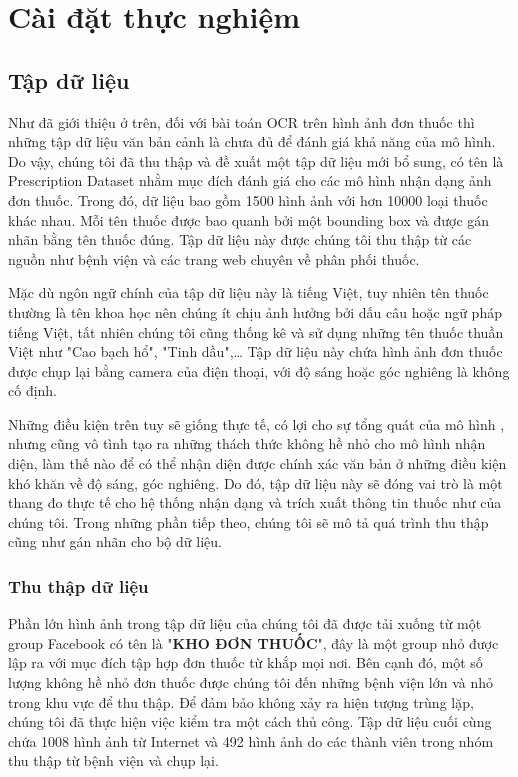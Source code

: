 \chapter{Cài đặt thực nghiệm}
\label{Chapter4}

\section{Tập dữ liệu}

Như đã giới thiệu ở trên, đối với bài toán OCR trên hình ảnh đơn thuốc thì những tập dữ liệu văn bản cảnh là chưa đủ để đánh giá khả năng của mô hình. Do vậy, chúng tôi đã thu thập và đề xuất một tập dữ liệu mới bổ sung, có tên là Prescription Dataset nhằm mục đích đánh giá cho các mô hình nhận dạng ảnh đơn thuốc. Trong đó, dữ liệu bao gồm 1500 hình ảnh với hơn 10000 loại thuốc khác nhau. Mỗi tên thuốc được bao quanh bởi một bounding box và được gán nhãn bằng tên thuốc đúng. Tập dữ liệu này được chúng tôi thu thập từ các nguồn như bệnh viện và các trang web chuyên về phân phối thuốc.

Mặc dù ngôn ngữ chính của tập dữ liệu này là tiếng Việt, tuy nhiên tên thuốc thường là tên khoa học nên chúng ít chịu ảnh hưởng bởi dấu câu hoặc ngữ pháp tiếng Việt, tất nhiên chúng tôi cũng thống kê và sử dụng những tên thuốc thuần Việt như "Cao bạch hổ", "Tinh dầu",… Tập dữ liệu này chứa hình ảnh đơn thuốc được chụp lại bằng camera của điện thoại, với độ sáng hoặc góc nghiêng là không cố định.

Những điều kiện trên tuy sẽ giống thực tế, có lợi cho sự tổng quát của mô hình , nhưng cũng vô tình tạo ra những thách thức không hề nhỏ cho mô hình nhận diện, làm thế nào để có thể nhận diện được chính xác văn bản ở những điều kiện khó khăn về độ sáng, góc nghiêng. Do đó, tập dữ liệu này sẽ đóng vai trò là một thang đo thực tế cho hệ thống nhận dạng và trích xuất thông tin thuốc như của chúng tôi. Trong những phần tiếp theo, chúng tôi sẽ mô tả quá trình thu thập cũng như gán nhãn cho bộ dữ liệu.

\subsection{Thu thập dữ liệu}
Phần lớn hình ảnh trong tập dữ liệu của chúng tôi đã được tải xuống từ một group
Facebook có tên là "\textbf{KHO ĐƠN THUỐC}", đây là một group nhỏ được lập ra với mục đích tập
hợp đơn thuốc từ khắp mọi nơi. Bên cạnh đó, một số lượng không hề nhỏ đơn thuốc được
chúng tôi đến những bệnh viện lớn và nhỏ trong khu vực để thu thập. Để đảm bảo không xảy ra hiện tượng trùng lặp, chúng tôi đã thực hiện việc kiểm tra một cách thủ công. Tập dữ
liệu cuối cùng chứa 1008 hình ảnh từ Internet và 492 hình ảnh do các thành viên trong nhóm thu thập từ bệnh viện và chụp lại.
